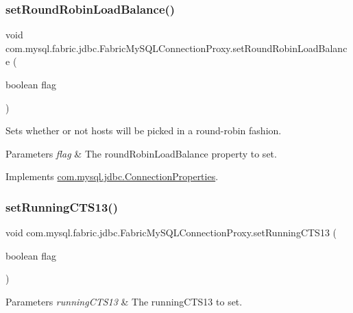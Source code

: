 \subsubsection{\texorpdfstring{set\+Round\+Robin\+Load\+Balance()}{setRoundRobinLoadBalance()}}
{\footnotesize\ttfamily void com.\+mysql.\+fabric.\+jdbc.\+Fabric\+My\+S\+Q\+L\+Connection\+Proxy.\+set\+Round\+Robin\+Load\+Balance (\begin{DoxyParamCaption}\item[{boolean}]{flag }\end{DoxyParamCaption})}

Sets whether or not hosts will be picked in a round-\/robin fashion.


\begin{DoxyParams}{Parameters}
{\em flag} & The round\+Robin\+Load\+Balance property to set. \\
\hline
\end{DoxyParams}


Implements \mbox{\hyperlink{interfacecom_1_1mysql_1_1jdbc_1_1_connection_properties_a13ef9e49985c436e69d1a8ed5eb095c6}{com.\+mysql.\+jdbc.\+Connection\+Properties}}.

\mbox{\label{classcom_1_1mysql_1_1fabric_1_1jdbc_1_1_fabric_my_s_q_l_connection_proxy_a3e401de958f968fb292eb8e882008020}} 
\subsubsection{\texorpdfstring{set\+Running\+C\+T\+S13()}{setRunningCTS13()}}
{\footnotesize\ttfamily void com.\+mysql.\+fabric.\+jdbc.\+Fabric\+My\+S\+Q\+L\+Connection\+Proxy.\+set\+Running\+C\+T\+S13 (\begin{DoxyParamCaption}\item[{boolean}]{flag }\end{DoxyParamCaption})}


\begin{DoxyParams}{Parameters}
{\em running\+C\+T\+S13} & The running\+C\+T\+S13 to set. \\
\hline
\end{DoxyParams}


